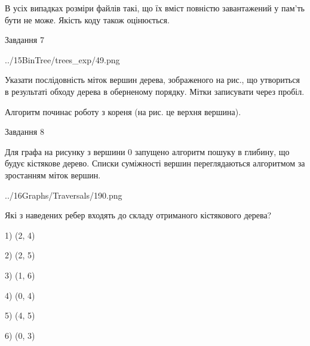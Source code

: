 \documentclass[12pt, ukrainian]{article}
\begin{document}
{В усіх випадках розміри файлів такі, що їх вміст повністю завантажений у пам'ть бути не може. Якість коду також оцінюється.



\vspace{10mm}\par

\newpage
\begin{minipage}[t]{9.7cm}
               
{\begin{center}Завдання {7}\end{center}}
\vspace{-4mm}

\begin{center}
	{../15BinTree/trees_exp/49.png}
\end{center}
Указати послідовність міток вершин дерева, зображеного на рис., що утвориться в результаті обходу дерева в оберненому порядку. Мітки записувати через пробіл.\par Алгоритм починає роботу з кореня (на рис. це верхня вершина).\par

\end{minipage}
\vline \hspace{8mm}
\begin{minipage}[t]{8.0cm}
               
{\begin{center}Завдання {8}\end{center}}
\vspace{-4mm}
Для графа на рисунку з вершини 0 запущено алгоритм пошуку в глибину, що будує кістякове дерево. Списки суміжності вершин переглядаються алгоритмом за зростанням міток вершин.\par
\begin{center}
	{../16Graphs/Traversals/190.png}
\end{center}
\par Які з наведених ребер входять до складу отриманого кістякового дерева?\par
1) (2, 4)\par
2) (2, 5)\par
3) (1, 6)\par
4) (0, 4)\par
5) (4, 5)\par
6) (0, 3)\par
{\vskip 15pt} \par


\end{minipage}}
\end{document}
